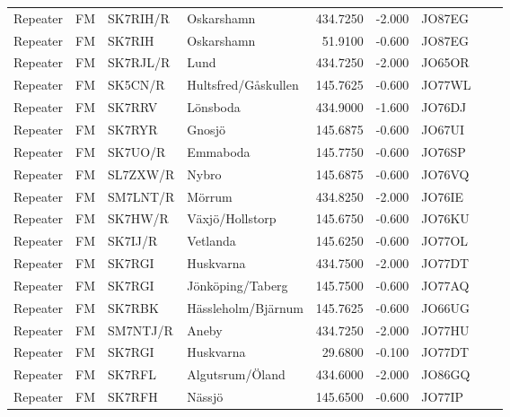 \begin{longtable}{llllrrlcl}
	Repeater & FM              & SK7RIH/R & Oskarshamn              &   434.7250 &   -2.000 & JO87EG &  &  \\
	Repeater & FM              & SK7RIH   & Oskarshamn              &    51.9100 &   -0.600 & JO87EG &  &  \\
	Repeater & FM              & SK7RJL/R & Lund                    &   434.7250 &   -2.000 & JO65OR &  &  \\
	Repeater & FM              & SK5CN/R  & Hultsfred/Gåskullen     &   145.7625 &   -0.600 & JO77WL &  &  \\
	Repeater & FM              & SK7RRV   & Lönsboda                &   434.9000 &   -1.600 & JO76DJ &  &  \\
	Repeater & FM              & SK7RYR   & Gnosjö                  &   145.6875 &   -0.600 & JO67UI &  &  \\
	Repeater & FM              & SK7UO/R  & Emmaboda                &   145.7750 &   -0.600 & JO76SP &  &  \\
	Repeater & FM              & SL7ZXW/R & Nybro                   &   145.6875 &   -0.600 & JO76VQ &  &  \\
	Repeater & FM              & SM7LNT/R & Mörrum                  &   434.8250 &   -2.000 & JO76IE &  &  \\
	Repeater & FM              & SK7HW/R  & Växjö/Hollstorp         &   145.6750 &   -0.600 & JO76KU &  &  \\
	Repeater & FM              & SK7IJ/R  & Vetlanda                &   145.6250 &   -0.600 & JO77OL &  &  \\
	Repeater & FM              & SK7RGI   & Huskvarna               &   434.7500 &   -2.000 & JO77DT &  &  \\
	Repeater & FM              & SK7RGI   & Jönköping/Taberg        &   145.7500 &   -0.600 & JO77AQ &  &  \\
	Repeater & FM              & SK7RBK   & Hässleholm/Bjärnum      &   145.7625 &   -0.600 & JO66UG &  &  \\
	Repeater & FM              & SM7NTJ/R & Aneby                   &   434.7250 &   -2.000 & JO77HU &  &  \\
	Repeater & FM              & SK7RGI   & Huskvarna               &    29.6800 &   -0.100 & JO77DT &  &  \\
	Repeater & FM              & SK7RFL   & Algutsrum/Öland         &   434.6000 &   -2.000 & JO86GQ &  &  \\
	Repeater & FM              & SK7RFH   & Nässjö                  &   145.6500 &   -0.600 & JO77IP &  &  \\

\end{longtable}

